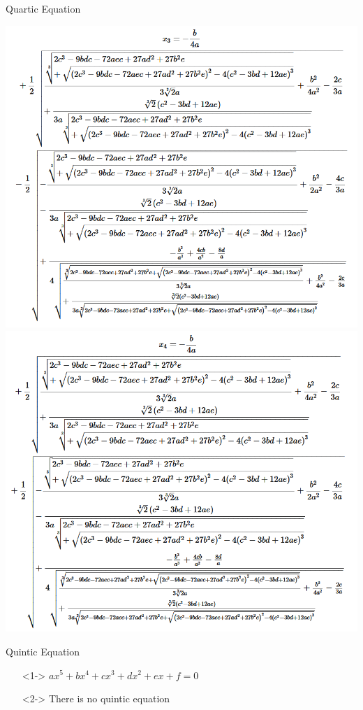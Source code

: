 \documentclass[aspectratio=169,xcolor=dvipsnames]{beamer}
\begin{document}
\begin{frame}{Quartic Equation}
\begin{center}
\begin{itemize}
{         {\includegraphics[scale=0.3]{images/x3.png}}
         {\includegraphics[scale=0.3]{images/x4.png}\vspace{0.3cm}}
        
        }
        \end{itemize}
    \end{center}
\end{frame}

\begin{frame}{Quintic Equation}
    \begin{itemize}
        \centering
        \item[]<1-> $ax^5 + bx^4 + cx^3+dx^2+ex+f = 0$ \vspace{0.5cm}
        \item[]<2-> \Huge There is no quintic equation
    \end{itemize}
\end{frame}
\end{document}
